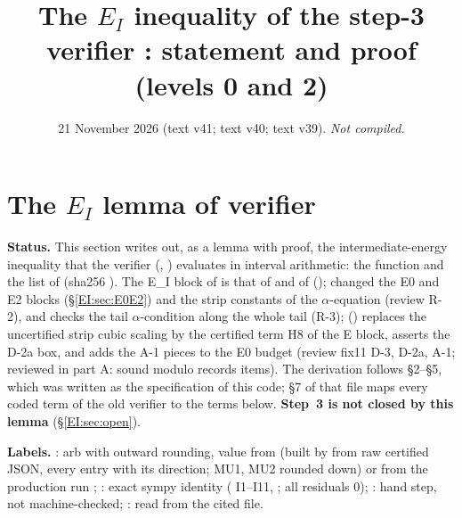 \documentclass[11pt]{article}
\title{The $E_I$ inequality of the step-3 verifier \fn{fin13v4c}: statement and proof (levels 0 and 2)}
\author{}\date{21 November 2026 (text v41; text v40; text v39). \emph{Not compiled.}}
\begin{document}
\maketitle
\fi
\providecommand{\Dv}{\mathcal D_V}

\section{The $E_I$ lemma of verifier }\label{EI:sec}
\noindent\textbf{Status.} This section writes out, as a lemma with proof, the intermediate-energy inequality that the verifier  (, ) evaluates in interval arithmetic: the function  and the list  of  (sha256 ). The E\_I block of  is that of  and of  ();  changed the E0 and E2 blocks (\S\ref{EI:sec:E0E2}) and the strip constants of the $\alpha$-equation (review R-2), and checks the tail $\alpha$-condition along the whole tail (R-3);  () replaces the uncertified strip cubic scaling  by the certified term H8 of the E block, asserts the D-2a box, and adds the A-1 pieces to the E0 budget (review fix11 D-3, D-2a, A-1; reviewed in  part A: sound modulo records items). The derivation follows  \S2--\S5, which was written as the specification of this code; \S7 of that file maps every coded term of the old verifier  to the terms below. \textbf{Step~3 is not closed by this lemma} (\S\ref{EI:sec:open}).

\noindent\textbf{Labels.} \tC: arb with outward rounding, value from  (built by  from raw certified JSON, every entry with its direction; MU1, MU2 rounded down) or from the production run ; \tS: exact sympy identity ( I1--I11, ; all residuals 0); \tHd: hand step, not machine-checked; \tR: read from the cited file.
\end{document}
